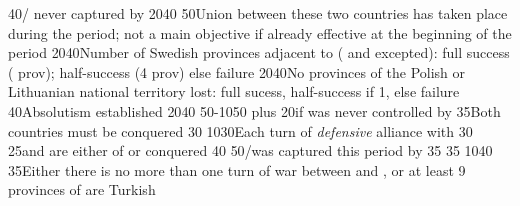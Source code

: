 {}{40}{\provinceOsterreich/ never captured by
  }%
%
{20}{40}{\EU@objNoRUSBaltique}%
%
{}{50}{Union between these two countries has taken place during the period;
  not a main objective if already effective at the beginning of the period}%
%
%
%
{20}{40}{Number of Swedish provinces adjacent to \regionBaltique (\regionSuede
  and \regionFinlande excepted): full success ( prov);
  half-success (4 prov) else failure}%
%
{20}{40}{No provinces of the Polish or Lithuanian national territory lost:
  full sucess, half-success if 1, else failure}%
%
{}{40}{Absolutism established}%
%
{20}{40}{\EU@objNoRUSBaltique}%
%
{50-10}{50}{ plus 20\VPs if \villeVienne was never
  controlled by \paysmajeurTurquie}%
%
%
%
%
{}{35}{Both countries must be conquered}%
%
{}{30}{}%
%
{10}{30}{Each turn of \emph{defensive} alliance with \paysmajeurFrance}%
%
{}{30}{}%
\EUobjective{}{\paysvalachie/\paysmoldavie}{}%
{}{25}{\paysvalachie and \paysmoldavie are either \VASSAL of \TUR or
  conquered}%
%
%
%
{}{40}{}%
%
{}{50}{\provinceOsterreich/\villeVienne was captured this period by \TUR}%
%
{}{35}{}%
%
{}{35}{}%
%
{10}{40}{\EU@objSpiceTUR}%
%
%
%
{}{35}{Either there is no more than one turn of war between \AUSaus and \TUR,
  or at least 9 provinces of \payshongrie are Turkish}%
